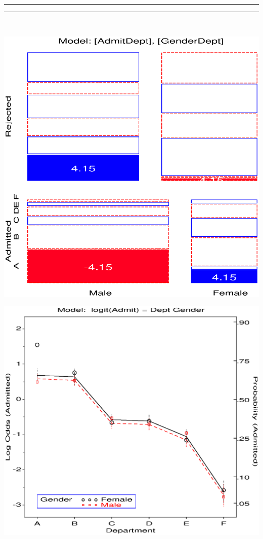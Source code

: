 \begin{center}
 \rule[-4pt]{0.5pt}{4pt}\hrulefill\rule[-4pt]{0.5pt}{4pt}\\
 \begin{minipage}[c]{.33\linewidth}
  \includegraphics[width=1\linewidth,clip=true,trim=0 0 0 
25]{ch7/fig/mosaic9a}
 \end{minipage}%
 \hfill
 \begin{minipage}[c]{.33\linewidth}
  \includegraphics[width=1\linewidth,clip=true]{ch7/fig/catberk2}

\end{minipage}
\end{center}
